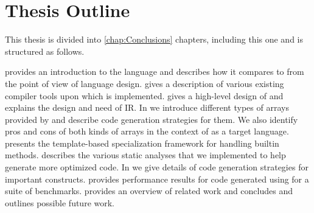 \section{Thesis Outline}

This thesis is divided into \ref{chap:Conclusions} chapters, including this one
and is structured as follows. 

 provides an introduction to the \xten language and describes
how it compares to \matlab from the point of view of language design.
 gives a description of various existing \matlab
compiler tools upon which \mixten is implemented. 
 gives a high-level design of \mixten and explains the
design and need of \mixten IR.
In  we introduce different types of arrays provided by
\xten and describe code generation strategies for them. We also identify pros
and cons of both kinds of arrays in the context of \xten as a target language.
 presents the template-based specialization framework for
handling \matlab builtin methods.
 describes the various static analyses that we
implemented to help generate more optimized code.
In  we give details of code generation strategies for
important \matlab constructs.
 provides performance results for code generated using
\mixten for a suite of benchmarks.
 provides an overview of related work and
 concludes and outlines possible future work.

